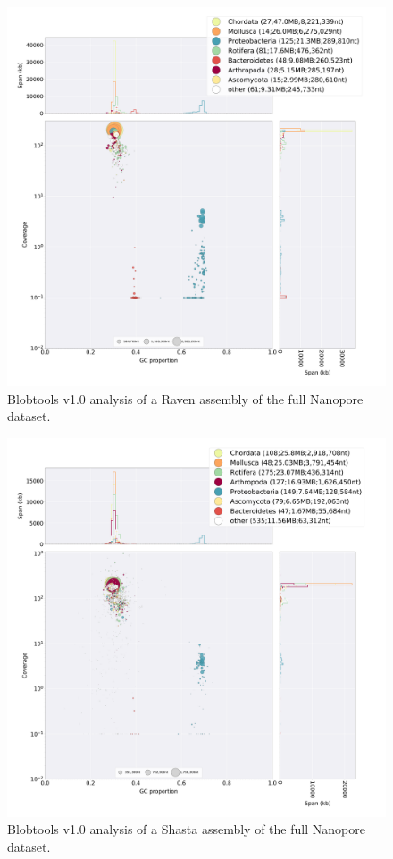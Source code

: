   \begin{figure}[ht]
    \centering
     \includegraphics[width=15cm]{fig/benchmark/ONT_RAVEN.png}
   \caption{Blobtools v1.0 analysis of a Raven assembly of the full Nanopore dataset.}
   \label{fig:blobtools_raven_ont}
 \end{figure}

  \begin{figure}[ht]
    \centering
     \includegraphics[width=15cm]{fig/benchmark/ONT_SHASTA.png}
   \caption{Blobtools v1.0 analysis of a Shasta assembly of the full Nanopore dataset.}
   \label{fig:blobtools_shasta_ont}
 \end{figure}

